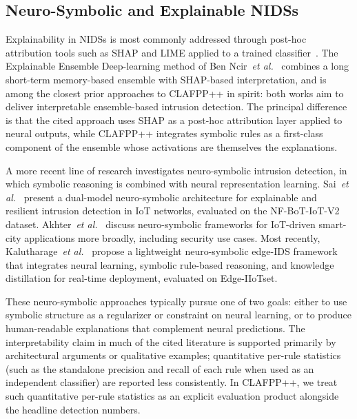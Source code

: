 \documentclass[pdflatex,sn-mathphys-num]{sn-jnl}
\theoremstyle{thmstyleone}
\theoremstyle{thmstyletwo}
\theoremstyle{thmstylethree}
\begin{document}
\subsection{Neuro-Symbolic and Explainable NIDSs}
Explainability in NIDSs is most commonly addressed through post-hoc attribution tools such as SHAP and LIME applied to a trained classifier~\cite{grabowski2025explainable,xai2025engapps}. The Explainable Ensemble Deep-learning method of Ben Ncir~\textit{et al.}~\cite{eed2024} combines a long short-term memory-based ensemble with SHAP-based interpretation, and is among the closest prior approaches to CLAFPP++ in spirit: both works aim to deliver interpretable ensemble-based intrusion detection. The principal difference is that the cited approach uses SHAP as a post-hoc attribution layer applied to neural outputs, while CLAFPP++ integrates symbolic rules as a first-class component of the ensemble whose activations are themselves the explanations.

A more recent line of research investigates neuro-symbolic intrusion detection, in which symbolic reasoning is combined with neural representation learning. Sai~\textit{et al.}~\cite{sai2025neurosymbolic} present a dual-model neuro-symbolic architecture for explainable and resilient intrusion detection in IoT networks, evaluated on the NF-BoT-IoT-V2 dataset. Akhter~\textit{et al.}~\cite{akhter2025neurosymbolic} discuss neuro-symbolic frameworks for IoT-driven smart-city applications more broadly, including security use cases. Most recently, Kalutharage~\textit{et al.}~\cite{neurosymbolic2026sensors} propose a lightweight neuro-symbolic edge-IDS framework that integrates neural learning, symbolic rule-based reasoning, and knowledge distillation for real-time deployment, evaluated on Edge-IIoTset.

These neuro-symbolic approaches typically pursue one of two goals: either to use symbolic structure as a regularizer or constraint on neural learning, or to produce human-readable explanations that complement neural predictions. The interpretability claim in much of the cited literature is supported primarily by architectural arguments or qualitative examples; quantitative per-rule statistics (such as the standalone precision and recall of each rule when used as an independent classifier) are reported less consistently. In CLAFPP++, we treat such quantitative per-rule statistics as an explicit evaluation product alongside the headline detection numbers.
\end{document}
